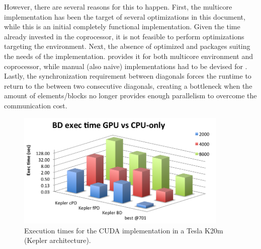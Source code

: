 \documentclass[../thesis]{subfiles}
\begin{document}
	However, there are several reasons for this to happen. First, the multicore implementation has been the target of several optimizations in this document, while this is an initial completely functional \cuda implementation. Given the time already invested in the \intel\xeonphi coprocessor, it is not feasible to perform optimizations targeting the \cuda environment. Next, the absence of optimized \blas and \lapack packages suiting the needs of the implementation. \mkl provides it for both multicore environment and coprocessor, while manual (also naive) implementations had to be devised for \cuda. Lastly, the synchronization requirement between diagonals forces the runtime to return to the \cpu between two consecutive diagonals, creating a bottleneck when the amount of elements/blocks no longer provides enough parallelism to overcome the communication cost.

	\begin{figure}[t]
		\centering
		\includegraphics[width=0.9\textwidth]{assets/images/cuda/times.png}
		\caption{Execution times for the CUDA implementation in a Tesla K20m (Kepler architecture).}
		\label{fig:cuda:results:times}
	\end{figure}
\end{document}
